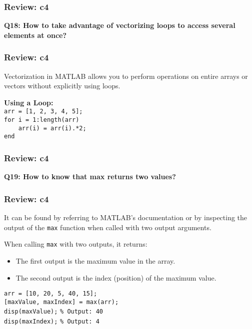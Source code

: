\documentclass[
	11pt, %
]{beamer}
\begin{document}
\begin{frame}
	\frametitle{Review: c4}

	\textbf{Q18: How to take advantage of vectorizing loops to access several elements at once?}

\end{frame}


\begin{frame}
	\frametitle{Review: c4}
 
Vectorization in MATLAB allows you to perform operations on entire arrays or vectors without explicitly using loops. 

    \textbf{Using a Loop:} \\
    \texttt{arr = [1, 2, 3, 4, 5];} \\
    \texttt{for i = 1:length(arr)} \\
    \texttt{\ \ \ \ arr(i) = arr(i).*2;} \\
    \texttt{end}

\end{frame}

\begin{frame}
	\frametitle{Review: c4}

	\textbf{Q19: How to know that max returns two values?}

\end{frame}


\begin{frame}
	\frametitle{Review: c4}

    It can be found by referring to MATLAB's documentation or by inspecting the output of the \texttt{max} function when called with two output arguments.

    \vspace{0.5cm}
    
    When calling \texttt{max} with two outputs, it returns:
    \begin{itemize}
        \item The first output is the maximum value in the array.
        \item The second output is the index (position) of the maximum value.
    \end{itemize}

    \texttt{arr = [10, 20, 5, 40, 15];} \\
    \texttt{[maxValue, maxIndex] = max(arr);} \\
    \texttt{disp(maxValue);}  \texttt{\% Output: 40} \\
    \texttt{disp(maxIndex);}  \texttt{\% Output: 4}

\end{frame}
\end{document}
